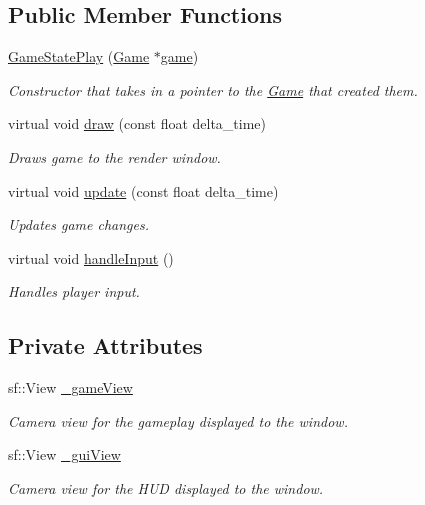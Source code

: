 \subsection*{Public Member Functions}
\begin{DoxyCompactItemize}
\item 
\hyperlink{class_game_state_play_a705c09eac3d2b27757e5b4cc048b22d5}{Game\+State\+Play} (\hyperlink{class_game}{Game} $\ast$\hyperlink{class_game_state_a355a79415b9ef63c2aec1448a99f6e71}{game})
\begin{DoxyCompactList}\small\item\em Constructor that takes in a pointer to the \hyperlink{class_game}{Game} that created them. \end{DoxyCompactList}\item 
virtual void \hyperlink{class_game_state_play_a63a3ba0c891afd8ec126806bab4f315a}{draw} (const float delta\+\_\+time)
\begin{DoxyCompactList}\small\item\em Draws game to the render window. \end{DoxyCompactList}\item 
virtual void \hyperlink{class_game_state_play_a2faf041a447ddf86726658455560abb8}{update} (const float delta\+\_\+time)
\begin{DoxyCompactList}\small\item\em Updates game changes. \end{DoxyCompactList}\item 
virtual void \hyperlink{class_game_state_play_ae9acc781e1fdbc931784ba3892c469ce}{handle\+Input} ()
\begin{DoxyCompactList}\small\item\em Handles player input. \end{DoxyCompactList}\end{DoxyCompactItemize}
\subsection*{Private Attributes}
\begin{DoxyCompactItemize}
\item 
sf\+::\+View \hyperlink{class_game_state_play_a9513cfeac2178d83e23ba6f9291fba8c}{\+\_\+game\+View}
\begin{DoxyCompactList}\small\item\em Camera view for the gameplay displayed to the window. \end{DoxyCompactList}\item 
sf\+::\+View \hyperlink{class_game_state_play_affee804e287fd1968fe8c5b0a303b05d}{\+\_\+gui\+View}
\begin{DoxyCompactList}\small\item\em Camera view for the H\+U\+D displayed to the window. \end{DoxyCompactList}\end{DoxyCompactItemize}
